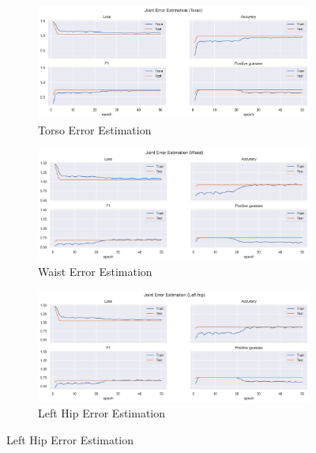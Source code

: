  \begin{figure}[!htbp]
    \centering
    \begin{subfigure}[b]{0.47\linewidth}
        \centering
        \includegraphics[width=\textwidth]{figures/Results/v2/jt/Torso_ErrorEstimation.png}
        \caption{Torso Error Estimation}
        \label{fig:v2_torso_jt_ee}
    \end{subfigure}
    \hfill
    \begin{subfigure}[b]{0.47\linewidth}
      \centering
      \includegraphics[width=\textwidth]{figures/Results/v2/jt/Waist_ErrorEstimation.png}
      \caption{Waist Error Estimation}
      \label{fig:v2_waist_jt_ee}
    \end{subfigure}
    \hfill
    \begin{subfigure}[b]{0.47\linewidth}
        \centering
        \includegraphics[width=\textwidth]{figures/Results/v2/jt/Left hip_ErrorEstimation.png}
        \caption{Left Hip Error Estimation}

\end{subfigure}
\end{figure}

